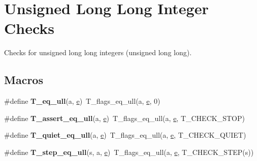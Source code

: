 \hypertarget{group__RTEMSTestFrameworkChecksULongLong}{}\section{Unsigned Long Long Integer Checks}
\label{group__RTEMSTestFrameworkChecksULongLong}


Checks for unsigned long long integers (unsigned long long).  


\subsection*{Macros}
\begin{DoxyCompactItemize}
\item 
\mbox{\label{group__RTEMSTestFrameworkChecksULongLong_gad2212e7c9fc2f4f2d3e7ed89afddf003}} 
\#define {\bfseries T\+\_\+eq\+\_\+ull}(a,  \mbox{\hyperlink{sun4u_2tte_8h_a8b0b9ed08e0e18920ec2682f48228c27}{e}})~T\+\_\+flags\+\_\+eq\+\_\+ull(a, \mbox{\hyperlink{sun4u_2tte_8h_a8b0b9ed08e0e18920ec2682f48228c27}{e}}, 0)
\item 
\mbox{\label{group__RTEMSTestFrameworkChecksULongLong_gab9ead3405c611e09198620cd58a2c336}} 
\#define {\bfseries T\+\_\+assert\+\_\+eq\+\_\+ull}(a,  \mbox{\hyperlink{sun4u_2tte_8h_a8b0b9ed08e0e18920ec2682f48228c27}{e}})~T\+\_\+flags\+\_\+eq\+\_\+ull(a, \mbox{\hyperlink{sun4u_2tte_8h_a8b0b9ed08e0e18920ec2682f48228c27}{e}}, T\+\_\+\+C\+H\+E\+C\+K\+\_\+\+S\+T\+OP)
\item 
\mbox{\label{group__RTEMSTestFrameworkChecksULongLong_ga2042c872d01a5fbd76bcce86d4046c20}} 
\#define {\bfseries T\+\_\+quiet\+\_\+eq\+\_\+ull}(a,  \mbox{\hyperlink{sun4u_2tte_8h_a8b0b9ed08e0e18920ec2682f48228c27}{e}})~T\+\_\+flags\+\_\+eq\+\_\+ull(a, \mbox{\hyperlink{sun4u_2tte_8h_a8b0b9ed08e0e18920ec2682f48228c27}{e}}, T\+\_\+\+C\+H\+E\+C\+K\+\_\+\+Q\+U\+I\+ET)
\item 
\mbox{\label{group__RTEMSTestFrameworkChecksULongLong_gaa5c6e10896c27683fbc00236088a4087}} 
\#define {\bfseries T\+\_\+step\+\_\+eq\+\_\+ull}(s,  a,  \mbox{\hyperlink{sun4u_2tte_8h_a8b0b9ed08e0e18920ec2682f48228c27}{e}})~T\+\_\+flags\+\_\+eq\+\_\+ull(a, \mbox{\hyperlink{sun4u_2tte_8h_a8b0b9ed08e0e18920ec2682f48228c27}{e}}, T\+\_\+\+C\+H\+E\+C\+K\+\_\+\+S\+T\+EP(s))

\end{DoxyCompactItemize}
